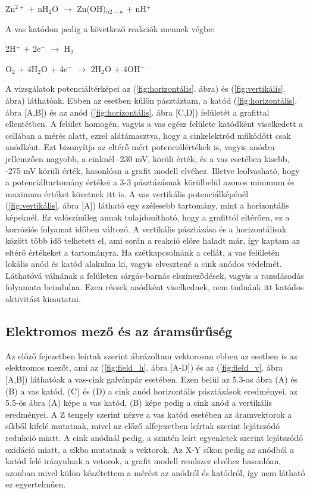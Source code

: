 Zn$^{2+}$ + nH$_2$O $\longrightarrow$ Zn(OH)$_{n2-n}$ + nH$^+$


A vas katódon pedig a következő reakciók mennek végbe:

2H$^+$ + 2e$^-$ $\longrightarrow$ H$_2$

O$_2$ + 4H$_2$O + 4e$^-$ $\longrightarrow$ 2H$_2$O + 4OH$^-$

A vizsgálatok potenciáltérképei az (\ref{fig:horizontális}. ábra) és (\ref{fig:vertikális}. ábra) láthatóak. Ebben az esetben külön pásztáztam, a katód (\ref{fig:horizontális}. ábra [A,B]) és az anód (\ref{fig:horizontális}. ábra [C,D]) felületét a grafittal ellentétben. A felület homogén, vagyis a vas egész felülete katódként viselkedett a cellában a mérés alatt, ezzel alátámasztva, hogy a cinkelektród működött csak anódként. Ezt bizonyítja az eltérő mért potenciálértékek is, vagyis anódra jellemzően nagyobb, a cinknél -230 mV, körüli érték, és a vas esetében kisebb, -275 mV körüli érték, hasonlóan a grafit modell elvéhez. Illetve leolvasható, hogy a potenciáltartomány értékei a 3-3 pásztázásnak körülbelül azonos minimum és maximum értéket követnek itt is. A vas vertikális potenciálképénél (\ref{fig:vertikális}. ábra [A]) látható egy szélesebb tartomány, mint a horizontális képeknél. Ez valószínűleg annak tulajdonítható, hogy a grafittól eltérően, ez a korróziós folyamat időben változó. A vertikális pásztázása és a horizontálisak között több idő telhetett el, ami során a reakció előre haladt már, így kaptam az eltérő értékeket a tartományra. Ha szétkapcsolnánk a cellát, a vas felületén lokális anód és katód alakulna ki, vagyis elvesztené a cink anódos védelmét. Láthatóvá válnának a felületen sárgás-barnás elszíneződések, vagyis a rozsdásodás folyamata beindulna. Ezen részek anódként viselkednek, nem tudnánk itt katódos aktivitást kimutatni. 

\subsection{Elektromos mező és az áramsűrűség}

Az előző fejezetben leírtak szerint ábrázoltam vektorosan ebben az esetben is az elektromos mezőt, ami az (\ref{fig:field_h}. ábra [A-D]) és az (\ref{fig:field_v}. ábra [A,B]) láthatóak a vas-cink galvánpár esetében. Ezen belül az 5.3-as ábra (A) és (B) a vas katód, (C) és (D) a cink anód horizontális pásztázások eredményei, az 5.5-ös ábra (A) képe a vas katód, (B) képe pedig a cink anód a vertikális eredményei. A Z tengely szerint nézve a vas katód esetében az áramvektorok a síkből kifelé mutatnak, mivel az előző alfejezetben leírtak szerint lejátszódó redukció miatt. A cink anódnál pedig, a szintén leírt egyenletek szerint lejátszódó oxidáció miatt, a síkba mutatnak a vektorok. Az X-Y síkon pedig az anódból a katód felé irányulnak a vetorok, a grafit modell rendszer elvéhez hasonlóan, azonban mivel külön készítettem a mérést az anódról és katódról, így nem látható ez egyertelműen.  

